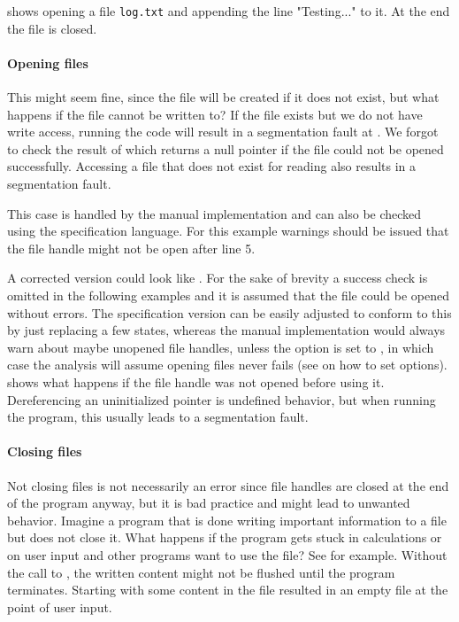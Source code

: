  shows opening a file \verb|log.txt| and appending the line "Testing..." to it. At the end the file is closed.

\paragraph*{Opening files}
This might seem fine, since the file will be created if it does not exist, but what happens if the file cannot be written to?
If the file exists but we do not have write access, running the code will result in a segmentation fault at .
We forgot to check the result of  which returns a null pointer if the file could not be opened successfully.
Accessing a file that does not exist for reading also results in a segmentation fault.

This case is handled by the manual implementation and can also be checked using the specification language. For this example warnings should be issued that the file handle might not be open after line 5.

A corrected version could look like .
For the sake of brevity a success check is omitted in the following examples and it is assumed that the file could be opened without errors. The specification version can be easily adjusted to conform to this by just replacing a few states, whereas the manual implementation would always warn about maybe unopened file handles, unless the option  is set to , in which case the analysis will assume opening files never fails (see  on how to set options).
 shows what happens if the file handle was not opened before using it. Dereferencing an uninitialized pointer is undefined behavior, but when running the program, this usually leads to a segmentation fault.

\paragraph*{Closing files}
Not closing files is not necessarily an error since file handles are closed at the end of the program anyway, but it is bad practice and might lead to unwanted behavior.
Imagine a program that is done writing important information to a file but does not close it. What happens if the program gets stuck in calculations or on user input and other programs want to use the file? See  for example. Without the call to , the written content might not be flushed until the program terminates. Starting with some content in the file resulted in an empty file at the point of user input.

